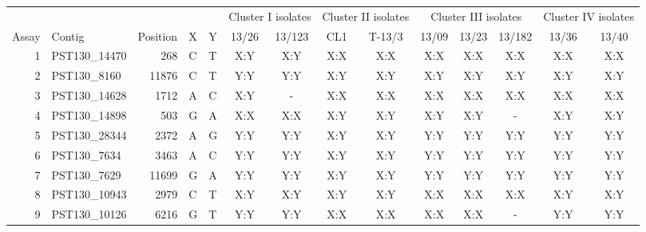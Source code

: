 \begin{tabular}{rlrll|cc|cc|ccc|cc}
\toprule
          &              &  &  & & \multicolumn{2}{c}{Cluster I isolates}        & \multicolumn{2}{c}{Cluster II isolates}        & \multicolumn{3}{c}{Cluster III isolates}         & \multicolumn{2}{c}{Cluster IV isolates}        \\
Assay & Contig       & Position &  X &  Y & 13/26              & 13/123 & CL1                 & T-13/3 & 13/09                & 13/23 & 13/182 & 13/36               & 13/40 \\
 \midrule
  1  & PST130\_14470 & 268      & C        & T        & X:Y                & X:Y    & X:X                 & X:X    & X:X                  & X:X   & X:X    & X:X                 & X:X   \\
  2  & PST130\_8160  & 11876    & C        & T        & Y:Y                & Y:Y    & X:Y                 & X:Y    & X:Y                  & X:Y   & X:Y    & X:Y                 & X:Y   \\
  3  & PST130\_14628 & 1712     & A        & C        & X:Y                & -      & X:X                 & X:X    & X:X                  & X:X   & X:X    & X:X                 & X:X   \\
  4  & PST130\_14898 & 503      & G        & A        & X:X                & X:X    & X:Y                 & X:Y    & X:Y                  & X:Y   & -      & X:Y                 & X:Y   \\
  5  & PST130\_28344 & 2372     & A        & G        & Y:Y                & Y:Y    & X:Y                 & X:Y    & Y:Y                  & Y:Y   & Y:Y    & Y:Y                 & Y:Y   \\
  6  & PST130\_7634  & 3463     & A        & C        & Y:Y                & Y:Y    & X:Y                 & X:Y    & Y:Y                  & Y:Y   & Y:Y    & Y:Y                 & Y:Y   \\
  7  & PST130\_7629  & 11699    & G        & A        & Y:Y                & Y:Y    & X:Y                 & X:Y    & Y:Y                  & Y:Y   & Y:Y    & Y:Y                 & Y:Y   \\
  8  & PST130\_10943 & 2979     & C        & T        & X:Y                & X:Y    & X:Y                 & X:Y    & X:X                  & X:X   & X:X    & X:Y                 & X:Y   \\
  9  & PST130\_10126 & 6216     & G        & T        & Y:Y                & Y:Y    & X:X                 & X:X    & X:X                  & X:X   & -      & Y:Y                 & Y:Y   \\

\end{tabular}
